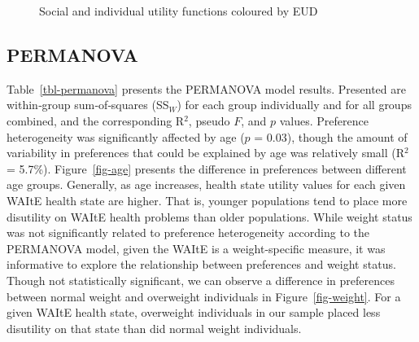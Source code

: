 \documentclass[
  letterpaper,
  DIV=11,
  numbers=noendperiod]{scrartcl}
\begin{document}
\begin{figure}


\caption{\label{fig-eud}Social and individual utility functions coloured
by EUD}

\end{figure}%

\subsection{PERMANOVA}\label{permanova}

Table~\ref{tbl-permanova} presents the PERMANOVA model results.
Presented are within‐group sum‐of‐squares (SS\(_W\)) for each group
individually and for all groups combined, and the corresponding R\(^2\),
pseudo \(F\), and \(p\) values. Preference heterogeneity was
significantly affected by age (\(p\) = 0.03), though the amount of
variability in preferences that could be explained by age was relatively
small (R\(^2\) = 5.7\%). Figure~\ref{fig-age} presents the difference in
preferences between different age groups. Generally, as age increases,
health state utility values for each given WAItE health state are
higher. That is, younger populations tend to place more disutility on
WAItE health problems than older populations. While weight status was
not significantly related to preference heterogeneity according to the
PERMANOVA model, given the WAItE is a weight-specific measure, it was
informative to explore the relationship between preferences and weight
status. Though not statistically significant, we can observe a
difference in preferences between normal weight and overweight
individuals in Figure~\ref{fig-weight}. For a given WAItE health state,
overweight individuals in our sample placed less disutility on that
state than did normal weight individuals.
\end{document}
